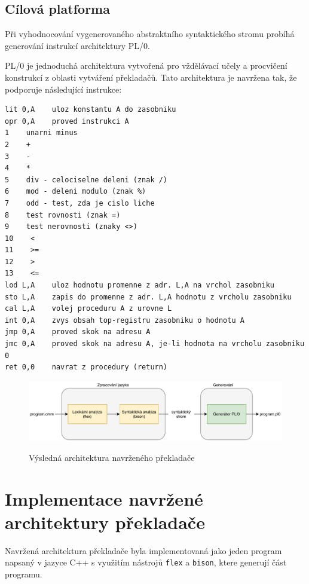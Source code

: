 \documentclass[12pt, a4paper]{article}
\let\oldsection\section
\renewcommand\section{\clearpage\oldsection}
\begin{document}
\subsection{Cílová platforma}
Při vyhodnocování vygenerovaného abstraktního syntaktického stromu probíhá generování instrukcí architektury PL/0.

PL/0 je jednoduchá architektura vytvořená pro vždělávací učely a procvičení konstrukcí z oblasti vytváření překladačů. Tato architektura je navržena tak, že podporuje následující instrukce:

\begin{lstlisting}[caption={Ukázka regulárních výrazů pro skenování tokenů}, captionpos=b, style=flex]
lit 0,A    uloz konstantu A do zasobniku
opr 0,A    proved instrukci A
1    unarni minus
2    +
3    -
4    *
5    div - celociselne deleni (znak /)
6    mod - deleni modulo (znak %)
7    odd - test, zda je cislo liche
8    test rovnosti (znak =)
9    test nerovnosti (znaky <>)
10    <
11    >=
12    >
13    <=
lod L,A    uloz hodnotu promenne z adr. L,A na vrchol zasobniku
sto L,A    zapis do promenne z adr. L,A hodnotu z vrcholu zasobniku
cal L,A    volej proceduru A z urovne L
int 0,A    zvys obsah top-registru zasobniku o hodnotu A
jmp 0,A    proved skok na adresu A
jmc 0,A    proved skok na adresu A, je-li hodnota na vrcholu zasobniku 0
ret 0,0    navrat z procedury (return)
\end{lstlisting}  


\begin{figure}[!ht]
    \centering
    {\includegraphics[width=\textwidth]{pdf/architecture.pdf}}
    \caption{Výsledná architektura navrženého překladače}
    \label{fig:screen-transition-diagram}
\end{figure}


\section{Implementace navržené architektury překladače}

Navržená architektura překladače byla implementovaná jako jeden program napsaný v jazyce C++ s využitím nástrojů \texttt{flex} a \texttt{bison}, ktere generují část programu.
\end{document}
